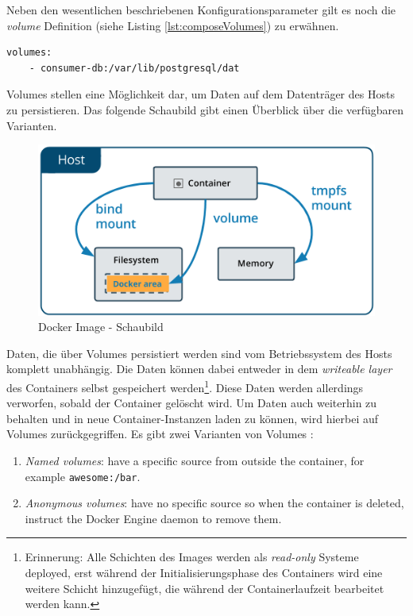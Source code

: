 Neben den wesentlichen beschriebenen Konfigurationsparameter gilt es noch die \emph{volume} Definition (siehe Listing \ref{lst:composeVolumes}) zu erwähnen. 


\begin{lstlisting}[style=bashStyle,caption={Docker Compose - Volume Definition},label=lst:composeVolumes]
  volumes:
    - consumer-db:/var/lib/postgresql/dat
\end{lstlisting}

Volumes stellen eine Möglichkeit dar, um Daten auf dem Datenträger des Hosts zu persistieren. Das folgende Schaubild gibt einen Überblick über die verfügbaren Varianten.

\begin{figure}[ht!]
	\centering
	\includegraphics[width=.6\linewidth]{kapitel/problemloesung/implementierung/_img/types-of-mounts-volume}
	\caption[Docker Image - Schaubild]{Docker Image - Schaubild \cite[Kapitel~/storage/volumes/]{docker-doc}}
	\label{fig:dockerImage}
\end{figure}

Daten, die über Volumes persistiert werden sind vom Betriebssystem des Hosts komplett unabhängig. Die Daten können dabei entweder in dem \emph{writeable layer} des Containers selbst gespeichert werden\footnote{Erinnerung: Alle Schichten des Images werden als \emph{read-only} Systeme deployed, erst während der Initialisierungsphase des Containers wird eine weitere Schicht hinzugefügt, die während der Containerlaufzeit bearbeitet werden kann.}. Diese Daten werden allerdings verworfen, sobald der Container gelöscht wird. Um Daten auch weiterhin zu behalten und in neue Container-Instanzen laden zu können, wird hierbei auf Volumes zurückgegriffen. Es gibt zwei Varianten von Volumes \cite[Kapitel~/storage/volumes]{docker-doc}: 

\begin{enumerate}
  \item \emph{Named volumes}: have a specific source from outside the container, for example \verb+awesome:/bar+.
  \item \emph{Anonymous volumes}: have no specific source so when the container is deleted, instruct the Docker Engine daemon to remove them.
\end{enumerate}

